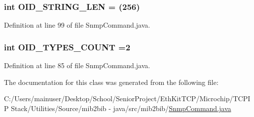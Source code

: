 \subsubsection[{O\+I\+D\+\_\+\+S\+T\+R\+I\+N\+G\+\_\+\+L\+E\+N}]{\setlength{\rightskip}{0pt plus 5cm}int O\+I\+D\+\_\+\+S\+T\+R\+I\+N\+G\+\_\+\+L\+E\+N = (256)}\label{classmib2bib_1_1_snmp_command_a98b77d9b2f08e98797d6d1d5a2c7c670}


Definition at line 99 of file Snmp\+Command.\+java.

\hypertarget{classmib2bib_1_1_snmp_command_ae1cc74c574312b077952eec6a54e1b53}{}
\subsubsection[{O\+I\+D\+\_\+\+T\+Y\+P\+E\+S\+\_\+\+C\+O\+U\+N\+T}]{\setlength{\rightskip}{0pt plus 5cm}int O\+I\+D\+\_\+\+T\+Y\+P\+E\+S\+\_\+\+C\+O\+U\+N\+T =2}\label{classmib2bib_1_1_snmp_command_ae1cc74c574312b077952eec6a54e1b53}


Definition at line 85 of file Snmp\+Command.\+java.



The documentation for this class was generated from the following file\+:\begin{DoxyCompactItemize}
\item 
C\+:/\+Users/mainuser/\+Desktop/\+School/\+Senior\+Project/\+Eth\+Kit\+T\+C\+P/\+Microchip/\+T\+C\+P\+I\+P Stack/\+Utilities/\+Source/mib2bib -\/ java/src/mib2bib/\hyperlink{_snmp_command_8java}{Snmp\+Command.\+java}\end{DoxyCompactItemize}
